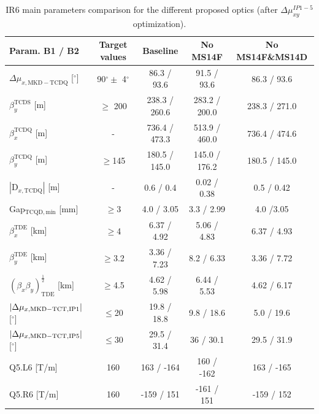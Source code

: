 \documentclass{cernatsnote}
\begin{document}
\begin{table}[h!]
\begin{center}
\caption{\label{tab_circuit_ms10} IR6 main parameters comparison for the different proposed optics (after $\Delta\mu_{xy}^{IP1-5}$ optimization).}
\begin{tabular}{lcccc} \hline
Param. B1 / B2 &  Target values  &   Baseline    &    No MS14F     &   No MS14F\&MS14D  \\ \hline
$\Delta\mu_{x,\mathrm{MKD-TCDQ}}$ [$^{\circ}$]  &  90$^{\circ} \pm$ 4$^{\circ}$  &    86.3 / 93.6   &     91.5 / 93.6    &    86.3 / 93.6  \\ 
$\beta_{y}^{\mathrm{TCDS}}$       [m]       &  $\geq$ 200            &    238.3 / 260.6   &  283.2 / 200.0   &    238.3 / 271.0   \\
$\beta_{x}^{\mathrm{TCDQ}}$       [m]       &   -             &    736.4 / 473.3   &  513.9 / 460.0   &    736.4 / 474.6   \\
$\beta_{y}^{\mathrm{TCDQ}}$       [m]       &  $\geq$145                   &    180.5 / 145.0  &  145.0 / 176.2   &    180.5 / 145.0   \\
$|\mathrm{D}_{x,\mathrm{TCDQ}}|$  [m]       &   -                 &    0.6 / 0.4       &     0.02 / 0.38  &    0.5 / 0.42       \\ 
Gap$_{\mathrm{TCQD,min}}$   [mm]       &    $\geq$3                 &    4.0 / 3.05      &    3.3  / 2.99  &    4.0 /3.05        \\ 
$\beta_{x}^{\mathrm{TDE}}$        [km]      &  $\geq$4                     &    6.37 / 4.92   &  5.06 / 4.83   &    6.37 / 4.93   \\
$\beta_{y}^{\mathrm{TDE}}$        [km]      &  $\geq$3.2                     &    3.36 / 7.23   &  8.2 / 6.33   &    3.36 / 7.72   \\
$(\beta_{x}\beta_{y})_{\mathrm{TDE}}^{\frac{1}{2}}$ [km] &       $\geq$4.5          &   4.62 / 5.98   &  6.44 / 5.53   &    4.62 / 6.17   \\
$|\Delta\mu_{x,\mathrm{MKD-TCT,\small{IP1}}}|$ [$^{\circ}$]  &    $\leq$20          &    19.8 / 18.8   &  9.8 / 18.6   &    5.0 / 19.6   \\        
$|\Delta\mu_{x,\mathrm{MKD-TCT,\small{IP5}}}|$ [$^{\circ}$]  &    $\leq$30          &    29.5 / 31.4   &  36 / 30.1   &    29.5 / 31.9   \\        
Q5.L6 [T/m]                                 &   160                        &            163 / -164             &           160 / -162                   &         163 / -165                     \\
Q5.R6 [T/m]                                 &   160                        &            -159 /  151      &               -161 / 151               &            -159 / 152                  \\ \hline

\end{tabular}
\end{center}
\end{table}
\end{document}

